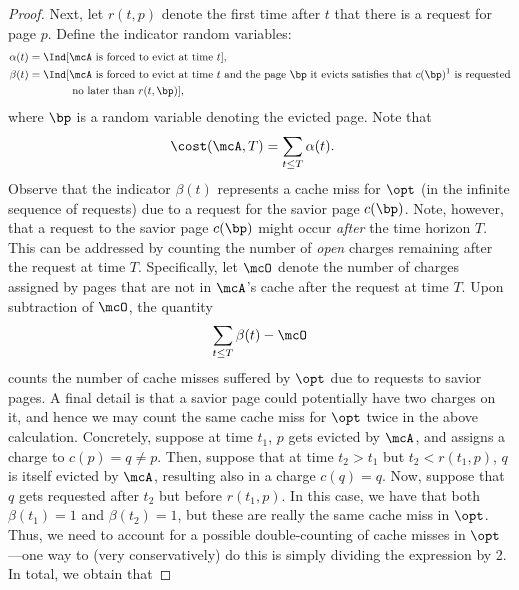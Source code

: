 \documentclass[11pt]{article}
\begin{document}
\begin{proof}
    Next, let $r(t,p)$ denote the first time after $t$ that there is a request for page $p$. Define the indicator random variables:
    \begin{align}
        \alpha(t) &= \Ind[\text{$\mcA$ is forced to evict at time $t$}], \label{eqn:alpha}\\
        \beta(t) &= \Ind[\text{$\mcA$ is forced to evict at time $t$ and the page $\bp$ it evicts satisfies that $c(\bp)$\footnotemark\ is requested} \nonumber \label{eqn:beta}\\
        &\qquad\qquad\text{no later than $r(t,\bp)$}],
    \end{align}
    where $\bp$ is a random variable denoting the evicted page. 
    Note that
    \begin{align*}
        \cost(\mcA, T) &= \sum_{t \le T}\alpha(t).
    \end{align*}
    Observe that the indicator $\beta(t)$ represents a cache miss for $\opt$ (in the infinite sequence of requests) due to a request for the savior page $c(\bp)$. Note, however, that a request to the savior page $c(\bp)$ might occur \textit{after} the time horizon $T$. This can be addressed by counting the number of \textit{open} charges remaining after the request at time $T$. Specifically, let $\mcO$ denote the number of charges assigned by pages that are not in $\mcA$'s cache after the request at time $T$.
    Upon subtraction of $\mcO$, the quantity
    \begin{align*}
        \sum_{t \le T}\beta(t) - \mcO
    \end{align*}
    counts the number of cache misses suffered by $\opt$ due to requests to savior pages. A final detail is that a savior page could potentially have two charges on it, and hence we may count the same cache miss for $\opt$ twice in the above calculation. Concretely, suppose at time $t_1$, $p$ gets evicted by $\mcA$, and assigns a charge to $c(p)=q \neq p$. Then, suppose that at time $t_2 > t_1$ but $t_2 < r(t_1,p)$, $q$ is itself evicted by $\mcA$, resulting also in a charge $c(q)=q$. Now, suppose that $q$ gets requested after $t_2$ but before $r(t_1,p)$. In this case, we have that both $\beta(t_1)=1$ and $\beta(t_2)=1$, but these are really the same cache miss in $\opt$. Thus, we need to account for a possible double-counting of cache misses in $\opt$---one way to (very conservatively) do this is simply dividing the expression by 2. In total, we obtain that

\end{proof}
\end{document}
